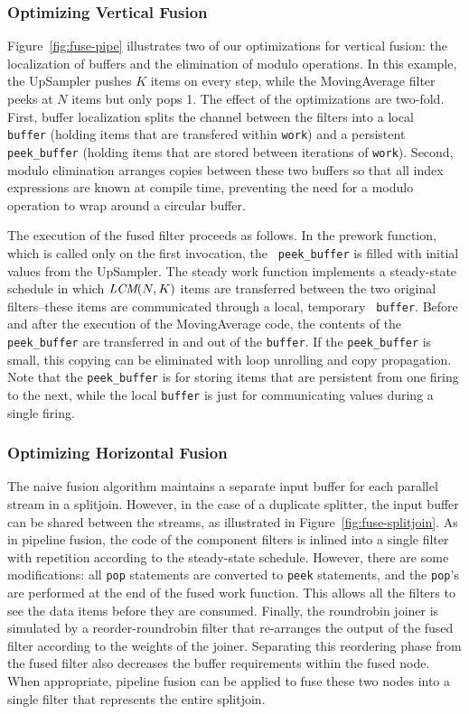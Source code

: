 \subsubsection{Optimizing Vertical Fusion}

Figure~\ref{fig:fuse-pipe} illustrates two of our optimizations for
vertical fusion: the localization of buffers and the elimination of
modulo operations.  In this example, the UpSampler pushes $K$ items on
every step, while the MovingAverage filter peeks at $N$ items but only
pops 1.  The effect of the optimizations are two-fold.  First, buffer
localization splits the channel between the filters into a local {\tt
buffer} (holding items that are transfered within {\tt work}) and a
persistent {\tt peek\_buffer} (holding items that are stored between
iterations of {\tt work}).  Second, modulo elimination arranges copies
between these two buffers so that all index expressions are known at
compile time, preventing the need for a modulo operation to wrap
around a circular buffer.

The execution of the fused filter proceeds as follows.  In the prework
function, which is called only on the first invocation, the {\tt
peek\_buffer} is filled with initial values from the UpSampler.  The
steady work function implements a steady-state schedule in which
$\mbox{\it LCM}(N, K)$ items are transferred between the two original
filters--these items are communicated through a local, temporary {\tt
buffer}.  Before and after the execution of the MovingAverage code,
the contents of the {\tt peek\_buffer} are transferred in and out of
the {\tt buffer}.  If the {\tt peek\_buffer} is small, this copying
can be eliminated with loop unrolling and copy propagation.  Note that
the {\tt peek\_buffer} is for storing items that are persistent from
one firing to the next, while the local {\tt buffer} is just for
communicating values during a single firing.

\subsubsection{Optimizing Horizontal Fusion}

The naive fusion algorithm maintains a separate input buffer for each
parallel stream in a splitjoin.  However, in the case of a duplicate
splitter, the input buffer can be shared between the streams, as
illustrated in Figure~\ref{fig:fuse-splitjoin}.  As in pipeline
fusion, the code of the component filters is inlined into a single
filter with repetition according to the steady-state schedule.
However, there are some modifications: all {\tt pop} statements are
converted to {\tt peek} statements, and the {\tt pop}'s are performed
at the end of the fused work function.  This allows all the filters to
see the data items before they are consumed.  Finally, the roundrobin
joiner is simulated by a reorder-roundrobin filter that re-arranges
the output of the fused filter according to the weights of the joiner.
Separating this reordering phase from the fused filter also decreases
the buffer requirements within the fused node.  When appropriate,
pipeline fusion can be applied to fuse these two nodes into a single
filter that represents the entire splitjoin.

